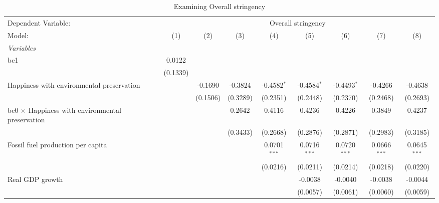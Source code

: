 
\begin{table}[htbp]
   \caption{Examining Overall stringency}
   \centering
   \begin{tabular}{lcccccccc}
      \tabularnewline \midrule \midrule
      Dependent Variable: & \multicolumn{8}{c}{Overall stringency}\\
      Model:                                                  & (1)      & (2)      & (3)      & (4)            & (5)            & (6)            & (7)            & (8)\\  
      \midrule
      \emph{Variables}\\
      bc1                                                     & 0.0122   &          &          &                &                &                &                &   \\   
                                                              & (0.1339) &          &          &                &                &                &                &   \\   
      Happiness with environmental preservation               &          & -0.1690  & -0.3824  & -0.4582$^{*}$  & -0.4584$^{*}$  & -0.4493$^{*}$  & -0.4266        & -0.4638\\   
                                                              &          & (0.1506) & (0.3289) & (0.2351)       & (0.2448)       & (0.2370)       & (0.2468)       & (0.2693)\\   
      bc0 $\times$ Happiness with environmental preservation  &          &          & 0.2642   & 0.4116         & 0.4236         & 0.4226         & 0.3849         & 0.4237\\   
                                                              &          &          & (0.3433) & (0.2668)       & (0.2876)       & (0.2871)       & (0.2983)       & (0.3185)\\   
      Fossil fuel production per capita                       &          &          &          & 0.0701$^{***}$ & 0.0716$^{***}$ & 0.0720$^{***}$ & 0.0666$^{***}$ & 0.0645$^{***}$\\   
                                                              &          &          &          & (0.0216)       & (0.0211)       & (0.0214)       & (0.0218)       & (0.0220)\\   
      Real GDP growth                                         &          &          &          &                & -0.0038        & -0.0040        & -0.0038        & -0.0044\\   
                                                              &          &          &          &                & (0.0057)       & (0.0061)       & (0.0060)       & (0.0059)\\   

\end{tabular}
\end{table}
